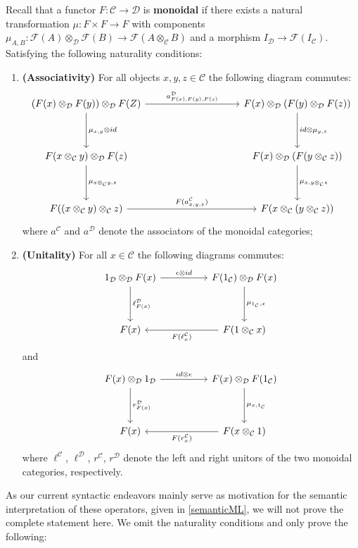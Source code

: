 \begin{defn}Recall that a functor $F : \mathcal{C} \to \mathcal{D}$ is \textbf{monoidal} if there exists a natural transformation $\mu : F \times F \to F$ with components $\mu_{A,B} : \mathcal{F}(A) \otimes_{\mathcal{D}} \mathcal{F}(B) \to \mathcal{F}(A \otimes_{\mathcal{C}} B)$ and a morphism $I_{\mathcal{D}} \to \mathcal{F}(I_{\mathcal{C}})$. Satisfying the following naturality conditions:\\
\begin{enumerate}%
\item \textbf{(Associativity)} For all objects $x,y,z \in \mathcal{C}$ the following diagram commutes:
  \[
    \ti
    (F(x) \otimes_{\mathcal{D}} F(y)) \otimes_{\mathcal{D}} F(Z)
    \ar[rr,"{a^{\mathcal{D}}_{F(x),F(y),F(z)}}"]
    \ar[d, "{\mu_{x,y} \otimes id}"] & &
    F(x) \otimes_{\mathcal{D}}( F(y)\otimes_{\mathcal{D}} F(z) )
    \ar[d, "{id\otimes \mu_{y,z}}"]\\
    F(x \otimes_{\mathcal{C}} y) \otimes_{\mathcal{D}} F(z)
    \ar[d, "{\mu_{x \otimes_{\mathcal{C}} y , z} }"]
     &&
     F(x) \otimes_{\mathcal{D}} ( F(y \otimes_{\mathcal{C}} z) )
     \ar[d, "\mu_{ x, y \otimes_{\mathcal{C}} z  }"]
     \\
     F( ( x \otimes_{\mathcal{C}} y ) \otimes_{\mathcal{C}} z  )
     \ar[rr, "F(a^{\mathcal{C}}_{x,y,z})"]&&
    F( x \otimes_{\mathcal{C}} ( y \otimes_{\mathcal{C}} z ) )
    \kz
\]
where $a^{\mathcal{C}}$ and $a^{\mathcal{D}}$ denote the associators of the monoidal categories;
\item \textbf{(Unitality)} For all $x \in \mathcal{C}$ the following diagrams commutes:
  \[
    \ti
    1_{\mathcal{D}} \otimes_{\mathcal{D}} F(x)
    \ar[r, "\epsilon \otimes id"]
    \ar[d, "\ell^{\mathcal{D}}_{F(x)}"]
      &
      F(1_{\mathcal{C}}) \otimes_{\mathcal{D}} F(x)
      \ar[d, "\mu_{1_{\mathcal{C}}, x }"]
      \\
      F(x) &
      \ar[l, "F(\ell^{\mathcal{C}}_x)"]
      F( 1 \otimes_{\mathcal{C}} x)
      \kz
\]
and
  \[
    \ti
     F(x) \otimes_{\mathcal{D}} 1_{\mathcal{D}} 
    \ar[r, "id \otimes \epsilon"]
    \ar[d, "r^{\mathcal{D}}_{F(x)}"]
      &
      F(x) \otimes_{\mathcal{D}}F(1_{\mathcal{C}}) 
      \ar[d, "\mu_{x, 1_{\mathcal{C}}}"]
      \\
      F(x) &
      \ar[l, "F(r^{\mathcal{C}}_x)"]
      F( x \otimes_{\mathcal{C}} 1)
      \kz
\]
where $\ell^{\mathcal{C}}$, $\ell^{\mathcal{D}}$, $r^{\mathcal{C}}$, $r^{\mathcal{D}}$ denote the left and right unitors of the two monoidal categories, respectively.
\end{enumerate}

As our current syntactic endeavors mainly serve as motivation for the semantic interpretation of these operators, given in \ref{semanticML}, we will not prove the complete statement here. We omit the naturality conditions and only prove the following:
\end{defn}
